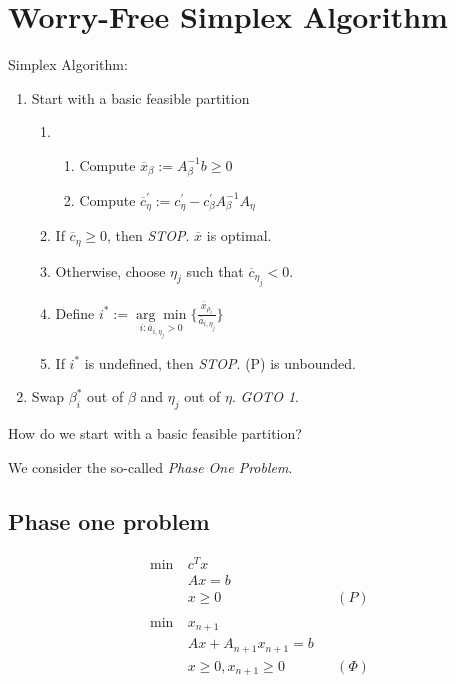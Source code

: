 
\section{Worry-Free Simplex Algorithm}
\begin{prev}
	Simplex Algorithm:
	\begin{enumerate}
		\item Start with a basic feasible partition
		      \begin{enumerate}
			      \item \begin{enumerate}
				            \item Compute \(\overline{x}_{\beta} := A^{-1}_{\beta} b \geq 0\)
				            \item Compute \(\overline{c}_{\eta}^\prime := c_{\eta}^\prime - c_{\beta}^\prime A^{-1}_{\beta} A_{\eta}\)
			            \end{enumerate}
			      \item If \(\overline{c}_{\eta} \geq 0\), then \emph{STOP}. \(\overline{x}\) is optimal.
			      \item Otherwise, choose \(\eta_j\) such that \(\overline{c}_{\eta_j} < 0\).
			      \item Define \(i^{*}:= \underset{i:\overline{a}_{i, \eta_j}>0}{\arg\min} \{\frac{\overline{x}_{\rho_i}}{\overline{a}_{i, \eta_j}}\} \)
			      \item If \(i^{*}\) is undefined, then \emph{STOP}. (P) is unbounded.
		      \end{enumerate}
		\item Swap \(\beta_i^{*}\) out of \(\beta \) and \(\eta_j\) out of \(\eta \). \emph{GOTO 1}.
	\end{enumerate}
\end{prev}

\begin{problem}
How do we start with a basic feasible partition?
\end{problem}

\begin{answer}
	We consider the so-called \emph{Phase One Problem}.
\end{answer}
\subsection{Phase one problem}
\begin{align*}
	\min~ & c^T x                                \\
	      & Ax = b                               \\
	      & x\geq 0                  &  & (P)    \\\\
	\min~ & x_{n+1}                              \\
	      & Ax + A_{n+1}x_{n+1} = b              \\
	      & x\geq 0, x_{n+1} \geq  0 &  & (\Phi)
\end{align*}

